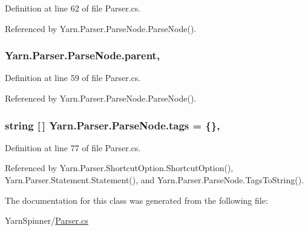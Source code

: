Definition at line 62 of file Parser.\-cs.



Referenced by Yarn.\-Parser.\-Parse\-Node.\-Parse\-Node().

\hypertarget{a00148_af313a82103fcc2ff5a177dbb06b92f7b}{
\subsubsection[{parent}]{ Yarn.\-Parser.\-Parse\-Node.\-parent\hspace{0.3cm}{\ttfamily [package]}, {\ttfamily [inherited]}}}\label{a00148_af313a82103fcc2ff5a177dbb06b92f7b}


Definition at line 59 of file Parser.\-cs.



Referenced by Yarn.\-Parser.\-Parse\-Node.\-Parse\-Node().

\hypertarget{a00148_a58b3a15788fd2d4127d73619dc6d04ae}{
\subsubsection[{tags}]{\setlength{\rightskip}{0pt plus 5cm}string \mbox{[}$\,$\mbox{]} Yarn.\-Parser.\-Parse\-Node.\-tags = \{\}\hspace{0.3cm}{\ttfamily [package]}, {\ttfamily [inherited]}}}\label{a00148_a58b3a15788fd2d4127d73619dc6d04ae}


Definition at line 77 of file Parser.\-cs.



Referenced by Yarn.\-Parser.\-Shortcut\-Option.\-Shortcut\-Option(), Yarn.\-Parser.\-Statement.\-Statement(), and Yarn.\-Parser.\-Parse\-Node.\-Tags\-To\-String().



The documentation for this class was generated from the following file\-:\begin{DoxyCompactItemize}
\item 
Yarn\-Spinner/\hyperlink{a00313}{Parser.\-cs}\end{DoxyCompactItemize}
